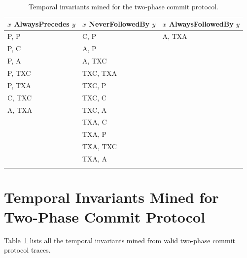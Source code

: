 \newpage
\appendix

\begin{table}[!t]
\begin{tabular}{lll}
$x$ AlwaysPrecedes $y$ &  $x$ NeverFollowedBy $y$    &   $x$ AlwaysFollowedBy $y$ \\
\hline
P, P & C, P & A, TXA \\
P, C & A, P &  \\
P, A & A, TXC & \\
P, TXC & TXC, TXA & \\
P, TXA & TXC, P & \\
C, TXC & TXC, C & \\
A, TXA & TXC, A & \\
& TXA, C & \\
& TXA, P & \\
& TXA, TXC & \\
& TXA, A & \\
\label{table:twopc_invariants}
\end{tabular}

\caption{Temporal invariants mined for the two-phase commit protocol.}
\end{table}

\section{Temporal Invariants Mined for Two-Phase Commit Protocol}
\label{appendix:twopc_invariants}

Table~\ref{table:twopc_invariants} lists all the temporal invariants mined
from valid two-phase commit protocol traces.

\newpage

